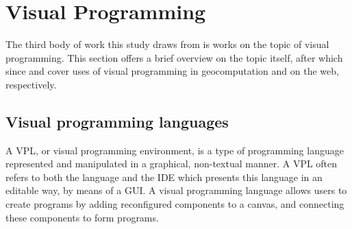 
\newpage

\section{Visual Programming}
\label{sec:background-vpl}

The third body of work this study draws from is works on the topic of visual programming. 
This section offers a brief overview on the topic itself, after which since  and  cover uses of visual programming in geocomputation and on the web, respectively. 

\subsection*{Visual programming languages}

A \ac{VPL}, or visual programming environment, is a type of programming language represented and manipulated in a graphical, non-textual manner.
A VPL often refers to both the language and the \ac{IDE} which presents this language in an editable way, by means of a \ac{GUI}.
A visual programming language allows users to create programs by adding reconfigured components to a canvas, and connecting these components to form programs. 

